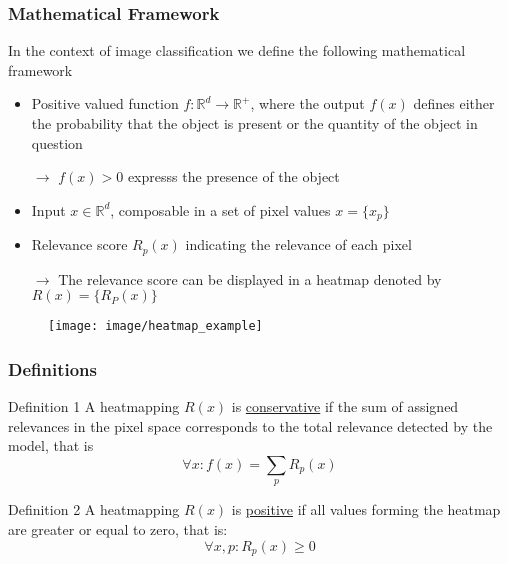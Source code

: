 \documentclass{beamer}
\begin{document}
\begin{frame}
\frametitle{Mathematical Framework}
\vspace{0.5cm} 
In the context of image classification we define the following mathematical framework
\begin{itemize}
\item Positive valued function $f:\mathbb{R}^d\to \mathbb{R}^+$, where the output $f(x)$ defines either the probability that the object is present or the quantity of the object in question
\item[$\rightarrow$] $f(x)>0$ expresss the presence of the object  
\item Input $x \in \mathbb{R}^d$, composable in a set of pixel values $x=\{x_p\}$
\item Relevance score $R_p(x)$ indicating the relevance of each pixel
\item[$\rightarrow$] The relevance score can be displayed in a heatmap denoted by $R(x) = \{R_P(x)\}$
\end{itemize}

\begin{figure}
\texttt{[image: image/heatmap\_example]}
\end{figure}

\end{frame}




\begin{frame}
\frametitle{Definitions}
\begin{block}{Definition 1}
A heatmapping $R(x)$ is \underline{conservative} if the sum of assigned relevances in the pixel space corresponds to the total relevance detected by the model, that is
\begin{equation}
\forall x: f(x)=\sum_pR_p(x)
\end{equation}
\end{block}

\begin{block}{Definition 2}
A heatmapping $R(x)$ is  \underline{positive} if all values forming the heatmap are greater or equal to zero, that is:
\begin{equation}
\forall x,p: R_p(x) \geq 0
\end{equation}
\end{block}

\end{frame}
\end{document}
